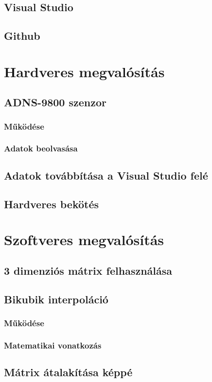 \documentclass[]{thesis-ekf}
\theoremstyle{definition}
\theoremstyle{remark}
\begin{document}
\section{Visual Studio}
\section{Github}
\chapter{Hardveres megvalósítás}
\section{ADNS-9800 szenzor}
\subsection{Működése}
\subsection{Adatok beolvasása}
\section{Adatok továbbítása a Visual Studio felé}
\section{Hardveres bekötés}
\chapter{Szoftveres megvalósítás}
\section{3 dimenziós mátrix felhasználása}
\section{Bikubik interpoláció}
\subsection{Működése}
\subsection{Matematikai vonatkozás}
\section{Mátrix átalakítása képpé}
\end{document}
